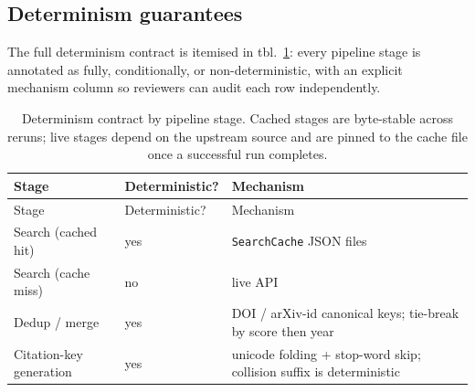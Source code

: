 \documentclass[
  english,
]{article}
\begin{document}
\subsection{Determinism guarantees}\label{determinism-guarantees}

The full determinism contract is itemised in tbl.~\ref{tbl:determinism}:
every pipeline stage is annotated as fully, conditionally, or
non-deterministic, with an explicit mechanism column so reviewers can
audit each row independently.

\begin{longtable}[]{@{}
  >{\raggedright\arraybackslash}p{}
  >{\raggedright\arraybackslash}p{}
  >{\raggedright\arraybackslash}p{}@{}}
\caption{Determinism contract by pipeline stage. Cached stages are
byte-stable across reruns; live stages depend on the upstream source and
are pinned to the cache file once a successful run
completes.}\label{tbl:determinism}\tabularnewline
\toprule\noalign{}
\begin{minipage}[b]{\linewidth}\raggedright
Stage
\end{minipage} & \begin{minipage}[b]{\linewidth}\raggedright
Deterministic?
\end{minipage} & \begin{minipage}[b]{\linewidth}\raggedright
Mechanism
\end{minipage} \\
\midrule\noalign{}
\endfirsthead
\toprule\noalign{}
\begin{minipage}[b]{\linewidth}\raggedright
Stage
\end{minipage} & \begin{minipage}[b]{\linewidth}\raggedright
Deterministic?
\end{minipage} & \begin{minipage}[b]{\linewidth}\raggedright
Mechanism
\end{minipage} \\
\midrule\noalign{}
\endhead
\bottomrule\noalign{}
\endlastfoot
Search (cached hit) & yes & \texttt{SearchCache} JSON files \\
Search (cache miss) & no & live API \\
Dedup / merge & yes & DOI / arXiv-id canonical keys; tie-break by score
then year \\
Citation-key generation & yes & unicode folding + stop-word skip;
collision suffix is deterministic \\

\end{longtable}
\end{document}
